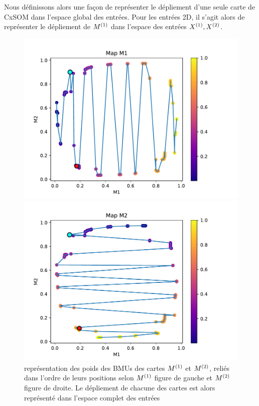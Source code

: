Nous définissons alors une façon de représenter le dépliement d'une seule carte de CxSOM dans l'espace global des entrées. Pour les entrées 2D, il s'agit alors de représenter le dépliement de $M^{({1})}$ dans l'espace des entrées $X^{({1})},X^{({2})}$.

\begin{figure}
    \begin{minipage}{0.45\textwidth}
    \includegraphics[width=\textwidth]{disto_cercle_M1.pdf}
    \end{minipage}
    \begin{minipage}{0.45\textwidth}
    \includegraphics[width=\textwidth]{disto_cercle_M2.pdf}
    \end{minipage}
    \caption{représentation des poids des BMUs des cartes $M^{({1})}$ et $M^{({2})}$, reliés dans l'ordre de leurs positions selon $M^{({1})}$ figure de gauche et $M^{({2})}$ figure de droite. Le dépliement de chacune des cartes est alors représenté dans l'espace complet des entrées \label{fig:distortion}}
    \end{figure}

